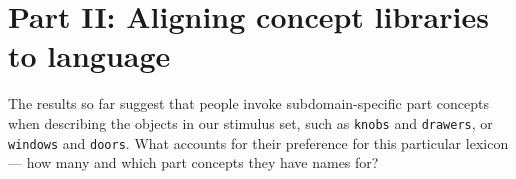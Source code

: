 \documentclass[10pt,letterpaper]{article}
\begin{document}




\section{Part II: Aligning concept libraries \\ to language}\label{sec-part-ii}
The results so far suggest that people invoke subdomain-specific part concepts when describing the objects in our stimulus set, such as \texttt{knobs} and \texttt{drawers}, or \texttt{windows} and \texttt{doors}.
What accounts for their preference for this particular lexicon --- how many and which part concepts they have names for?
\end{document}
